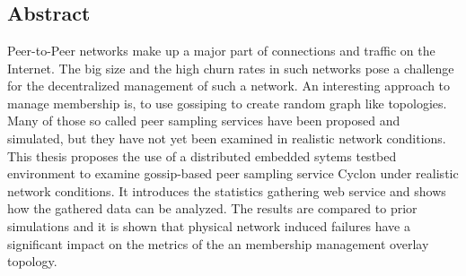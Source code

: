 \chapter*{\abstractname}

\section*{Abstract}
Peer-to-Peer networks make up a major part of connections and traffic on the
Internet. The big size and the high churn rates in such networks pose a
challenge for the decentralized management of such a network. An interesting
approach to manage membership is, to use gossiping to create random graph like
topologies. Many of those so called peer sampling services have been proposed
and simulated, but they have not yet been examined in realistic network
conditions. This thesis proposes the use of a distributed embedded
sytems testbed environment to examine gossip-based peer sampling service Cyclon
under realistic network conditions. It introduces the statistics gathering web
service and shows how the gathered data can be analyzed. The results are
compared to prior simulations and it is shown that physical network induced
failures have a significant impact on the metrics of the an membership
management overlay topology.
